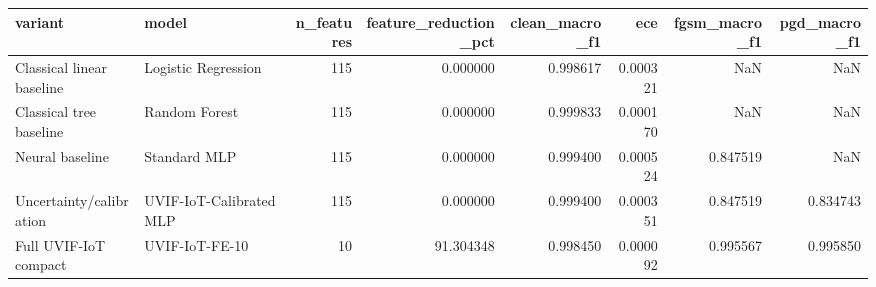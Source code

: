 \begin{tabular}{llrrrrrr}
\toprule
variant & model & n\_features & feature\_reduction\_pct & clean\_macro\_f1 & ece & fgsm\_macro\_f1 & pgd\_macro\_f1 \\
\midrule
Classical linear baseline & Logistic Regression & 115 & 0.000000 & 0.998617 & 0.000321 & NaN & NaN \\
Classical tree baseline & Random Forest & 115 & 0.000000 & 0.999833 & 0.000170 & NaN & NaN \\
Neural baseline & Standard MLP & 115 & 0.000000 & 0.999400 & 0.000524 & 0.847519 & NaN \\
Uncertainty/calibration & UVIF-IoT-Calibrated MLP & 115 & 0.000000 & 0.999400 & 0.000351 & 0.847519 & 0.834743 \\
Full UVIF-IoT compact & UVIF-IoT-FE-10 & 10 & 91.304348 & 0.998450 & 0.000092 & 0.995567 & 0.995850 \\
\bottomrule
\end{tabular}
